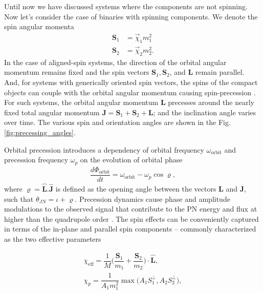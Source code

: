 Until now we have discussed systems where the components are not spinning. Now let's consider the case of binaries with spinning components. We denote the spin angular momenta 
\begin{align}
    \textbf{S}_1 &= \vec{\chi}_1 m_1^2 \\
    \textbf{S}_2 &= \vec{\chi}_2 m_2^2.
\end{align}
In the case of aligned-spin systems, the direction of the orbital angular momentum remains fixed and the spin vectors $\textbf{S}_1, \textbf{S}_2$, and $\textbf{L}$ remain parallel. %
And, for systems with generically oriented spin vectors, the spins of the compact objects can couple with the orbital angular momentum causing spin-precession \cite{Apostolatos:1994mx}. For such systems, the orbital angular momentum $\textbf{L}$ precesses around the nearly fixed total angular momentum $\textbf{J} = \textbf{S}_1 + \textbf{S}_2 + \textbf{L}$; and the inclination angle varies over time. The various spin and orientation angles are shown in the Fig. \ref{fig:precessing_angles}. 

Orbital precession introduces a dependency of orbital frequency $\omega_{\text{orbit}}$ and precession frequency $\omega_{p}$ on the evolution of orbital phase
\begin{align}
    \dfrac{d\Phi_{\text{orbit}}}{dt} = \omega_{\text{orbit}} - \omega_{p}\cos\varrho,
\end{align}
where $\varrho = \hat{\textbf{L}}.\hat{\textbf{J}}$ is defined as the opening angle between the vectors $\textbf{L}$ and $\textbf{J}$, such that $\theta_{JN} = \iota + \varrho$. Precession dynamics cause phase and amplitude modulations to the observed signal that contribute to the PN energy and flux at higher than the quadrupole order \cite{Hannam:2013pra,Pekowsky:2013ska}. The spin effects can be conveniently captured in terms of the in-plane and parallel spin components -- commonly characterized as the two effective parameters \cite{Ajith:2009bn, Schmidt:2014iyl}

\begin{align}
    \chi_{\text{eff}} = \dfrac{1}{M}\Bigg(\dfrac{\textbf{S}_1}{m_1}+\dfrac{\textbf{S}_2}{m_2}\Bigg)\cdot\hat{\textbf{L}}, \label{eq:chi_eff_old}\\
    \chi_{p} = \dfrac{1}{A_1m_1^2}\max\Big(A_1 S_1^{\perp},A_2 S_2^{\perp}\Big), \label{eq:chi_P_old}
\end{align} 

